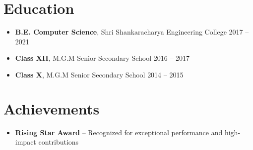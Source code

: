 \documentclass[11pt]{article}
\newcommand{\rside}[1]{\hfill {\color{accent} #1}}
\begin{document}
\section{Education}
\begin{itemize}
\item \textbf{B.E. Computer Science}, Shri Shankaracharya Engineering College \rside{2017 -- 2021}
\item \textbf{Class XII}, M.G.M Senior Secondary School \rside{2016 -- 2017}
\item \textbf{Class X}, M.G.M Senior Secondary School \rside{2014 -- 2015}
\end{itemize}

\section{Achievements}
\begin{itemize}
\item \textbf{Rising Star Award} – Recognized for exceptional performance and high-impact contributions
\end{itemize}
\end{document}

